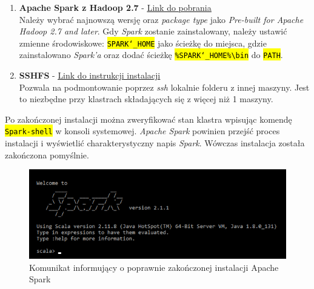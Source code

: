 \documentclass[a4paper,onecolumn,oneside,12pt]{memoir}
\begin{document}
{{\begin{enumerate}
{\centerline{\texttt{\hl{HADOOP{\char`_}HOME = Lokalizacja{\char`_}utworzonego{\char`_}folderu{\char`_}Hadoop}}}
}

\vspace{6mm}
\item {
\textbf{Apache Spark z Hadoop 2.7} - \underline{\href{http://spark.apache.org/downloads.html}{Link do pobrania}}  \\
Należy wybrać najnowszą wersję oraz \textit{package type} jako \textit{Pre-built for Apache Hadoop 2.7 and later}. Gdy \textit{Spark} zostanie zainstalowany, należy ustawić zmienne środowiskowe: \texttt{\hl{SPARK{\char`_}HOME}} jako ścieżkę do miejsca, gdzie zainstalowano \textit{Spark’a} oraz dodać ścieżkę \texttt{\hl{\%SPARK{\char`_}HOME\%\textbackslash bin}} do \texttt{\hl{PATH}}.
}

\vspace{6mm}
\item {
\textbf{SSHFS} - \underline{\href{https://www.digitalocean.com/community/tutorials/how-to-use-sshfs-to-mount-remote-file-systems-over-ssh}{Link do instrukcji instalacji}} \\
Pozwala na podmontowanie poprzez \textit{ssh} lokalnie folderu z innej maszyny.
Jest to niezbędne przy klastrach składających się z więcej niż 1 maszyny.
}
\end{enumerate}
\vspace{6mm}
Po zakończonej instalacji można zweryfikować stan klastra wpisując komendę
{\texttt{\hl{Spark-shell}}} w konsoli systemowej. \textit{Apache Spark} powinien przejść proces instalacji i wyświetlić
charakterystyczny napis \textit{Spark}. Wówczas instalacja została zakończona pomyślnie.

\begin{figure}[h]
	\centering
	\includegraphics[width=1\linewidth]{spark-installed}
	\caption{Komunikat informujący o poprawnie zakończonej instalacji Apache Spark}
	\label{fig:stronaTytulowa}
\end{figure}



\pagebreak
\vspace*{1mm}
}}
\end{document}
